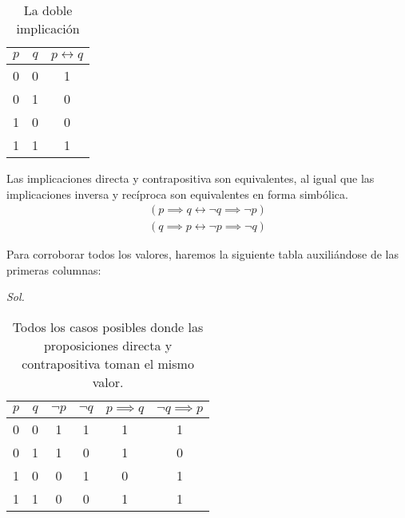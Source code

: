 \begin{table}[h!]
	\centering
	\begin{tabular}{|c|c|c|}
		\hline
		$p$ & $q$ & $p \longleftrightarrow  q$ \\ \hline
		0   & 0   & 1                          \\ \hline
		0   & 1   & 0                          \\ \hline
		1   & 0   & 0                          \\ \hline
		1   & 1   & 1                          \\ \hline
	\end{tabular}
	\caption{La doble implicación}
	\label{tabfmc6}
\end{table}


\begin{theorem}[Implicaciones]
	Las implicaciones directa y contrapositiva son equivalentes,
	al igual que las implicaciones inversa y recíproca son equivalentes
	en forma simbólica.
	\begin{gather*}
		(p \implies  q \longleftrightarrow \lnot q \implies \lnot p) \\
		(q \implies  p \longleftrightarrow \lnot p \implies \lnot q)
	\end{gather*}
\end{theorem}


\begin{exercise}
	Para corroborar todos los valores, haremos la siguiente tabla auxiliándose de las primeras columnas:
\end{exercise}

\textit{ Sol. }

\begin{table}[h!]
	\centering
	\begin{tabular}{|c|c|c|c|c|c|}
		\hline
		$p$ & $q$ & $\lnot p$ & $\lnot q$ & $p \implies q$ & $\lnot q \implies p$ \\ \hline
		0   & 0   & 1         & 1         & 1              & 1                    \\ \hline
		0   & 1   & 1         & 0         & 1              & 0                    \\ \hline
		1   & 0   & 0         & 1         & 0              & 1                    \\ \hline
		1   & 1   & 0         & 0         & 1              & 1                    \\ \hline
	\end{tabular}
	\caption{ Todos los casos posibles donde las proposiciones directa y contrapositiva toman el mismo valor.}
	\label{tabfmc7}
\end{table}

